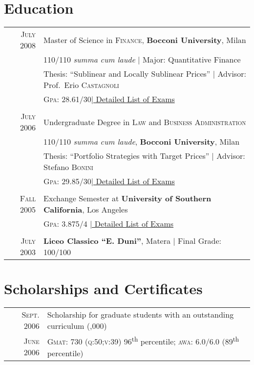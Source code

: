\documentclass[a4paper,10pt]{article}
\begin{document}
\section{Education}
\begin{tabular}{rl}
  \textsc{July} 2008 & Master of Science in \textsc{Finance}, \textbf{Bocconi University}, Milan\\
                     & 110/110 \small\emph{summa cum laude} | Major: Quantitative Finance\\
                     & Thesis: ``Sublinear and Locally Sublinear Prices'' | \small Advisor: Prof.\
                       Erio \textsc{Castagnoli}\\
                     & \normalsize \textsc{Gpa}: 28.61/30\hyperlink{grds}{\hfill | \footnotesize
                       Detailed List of Exams}\\&\\

  \textsc{July} 2006& Undergraduate Degree in \textsc{Law} and \textsc{Business Administration} \\&110/110 \small\emph{summa cum laude}, \normalsize\textbf{Bocconi University}, Milan\\
                    & Thesis: ``Portfolio Strategies with Target Prices'' | \small Advisor: Stefano \textsc{Bonini}\\
                    &\normalsize \textsc{Gpa}: 29.85/30\hyperlink{grds_cleli}{\hfill| \footnotesize Detailed List of Exams}\\&\\

  \textsc{Fall} 2005& Exchange Semester at \textbf{University of Southern California}, Los Angeles\\
                    &\textsc{Gpa}: 3.875/4 \hyperlink{grds_usc}{\hfill| \footnotesize Detailed List of Exams}\\&\\

  \textsc{July} 2003& \textbf{Liceo Classico ``E. Duni''}, Matera | Final Grade: 100/100
\end{tabular}

\section{Scholarships and Certificates}
\begin{tabular}{rl}
  \textsc{Sept.} 2006 & Scholarship for graduate students with an outstanding curriculum \footnotesize(\EURcr 30,000)\normalsize\\
  \textsc{June} 2006 & {\textsc{Gmat}\textregistered}\setmainfont[SmallCapsFont=Fontin-SmallCaps.otf]{Fontin.otf}: 730 (\textsc{q:50;v:39}) 96\textsuperscript{th} percentile; \textsc{awa}: 6.0/6.0 (89\textsuperscript{th} percentile)
\end{tabular}
\end{document}

